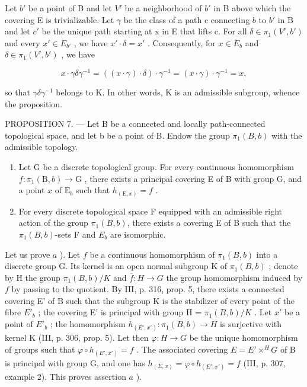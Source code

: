 Let \(b'\) be a point of B and let \(V'\) be a neighborhood of \(b'\) in B above which the covering E is trivializable. Let \(\gamma\) be the class of a path c connecting \(b\) to \(b'\) in B and let \(c'\) be the unique path starting at x in E that lifts c. For all \(\delta \in \pi_1(V', b')\) and every \(x' \in E_{b'}\) , we have \(x' \cdot \delta = x'\) . Consequently, for \(x \in E_b\) and \(\delta \in \pi_1(V', b')\) , we have

\[
x \cdot \gamma \delta \gamma^ {- 1} = ((x \cdot \gamma) \cdot \delta) \cdot \gamma^ {- 1} = (x \cdot \gamma) \cdot \gamma^ {- 1} = x,
\]

so that \(\gamma\delta\gamma^{-1}\) belongs to K. In other words, K is an admissible subgroup, whence the proposition.

PROPOSITION 7. --- Let B be a connected and locally path-connected topological space, and let b be a point of B. Endow the group \(\pi_1(B, b)\) with the admissible topology.

\begin{enumerate}
\def\labelenumi{\alph{enumi})}
\item
  Let G be a discrete topological group. For every continuous homomorphism \(f\colon \pi_{1}(\mathrm{B},b)\to \mathrm{G}\) , there exists a principal covering E of B with group G, and a point \(x\) of \(\mathrm{E}_{b}\) such that \(h_{(\mathrm{E},x)} = f\) .
\item
  For every discrete topological space F equipped with an admissible right action of the group \(\pi_{1}(B,b)\), there exists a covering E of B such that the \(\pi_{1}(B,b)\)-sets F and \(E_{b}\) are isomorphic.
\end{enumerate}

Let us prove \(a\) ). Let \(f\) be a continuous homomorphism of \(\pi_1(B, b)\) into a discrete group G. Its kernel is an open normal subgroup K of \(\pi_1(B, b)\) ; denote by H the group \(\pi_1(B, b)/K\) and \(\overline{f} \colon H \to G\) the group homomorphism induced by \(f\) by passing to the quotient. By III, p. 316, prop. 5, there exists a connected covering E' of B such that the subgroup K is the stabilizer of every point of the fibre \(E'_{b}\) ; the covering E' is principal with group H = \(\pi_1(B, b)/K\) . Let \(x'\) be a point of \(E'_{b}\) ; the homomorphism \(h_{(E', x')} \colon \pi_1(B, b) \to H\) is surjective with kernel K (III, p. 306, prop. 5). Let then \(\varphi \colon H \to G\) be the unique homomorphism of groups such that \(\varphi \circ h_{(E', x')} = f\) . The associated covering \(E = E' \times^{H} G\) of B is principal with group G, and one has \(h_{(E, x)} = \varphi \circ h_{(E', x')} = f\) (III, p. 307, example 2). This proves assertion \(a\) ).

